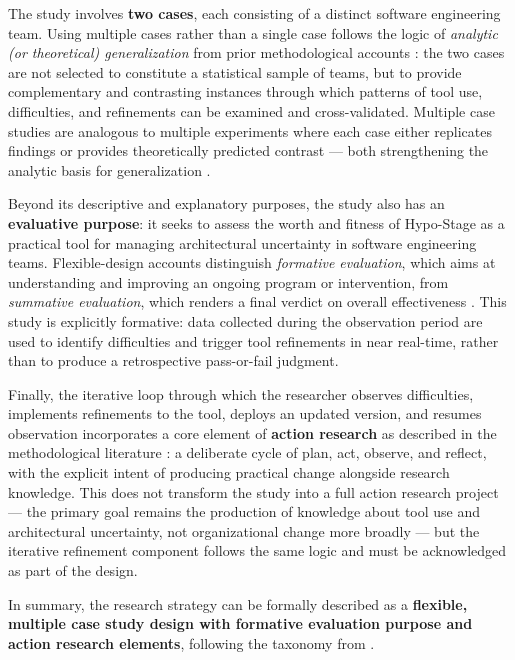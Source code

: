 The study involves \textbf{two cases}, each consisting of a distinct software
engineering team. Using multiple cases rather than a single case follows the logic
of \emph{analytic (or theoretical) generalization} from prior methodological accounts \citep{robson2016,yin2009}: the
two cases are not selected to constitute a statistical sample of teams, but to provide
complementary and contrasting instances through which patterns of tool use,
difficulties, and refinements can be examined and cross-validated. Multiple case studies are analogous to multiple
experiments where each case either replicates findings or provides theoretically predicted contrast --- both strengthening the analytic basis for generalization \citep{robson2016}.

Beyond its descriptive and explanatory purposes, the study also has an
\textbf{evaluative purpose}: it seeks to assess the worth and fitness of Hypo-Stage
as a practical tool for managing architectural uncertainty in software engineering
teams. Flexible-design accounts distinguish \emph{formative evaluation}, which
aims at understanding and improving an ongoing program or intervention, from
\emph{summative evaluation}, which renders a final verdict on overall effectiveness \citep{robson2016}.
This study is explicitly formative: data collected during the observation period are used to identify difficulties and trigger tool refinements in near real-time, rather than to produce a retrospective pass-or-fail judgment.

Finally, the iterative loop through which the researcher observes difficulties,
implements refinements to the tool, deploys an updated version, and resumes
observation incorporates a core element of \textbf{action research} as described
in the methodological literature \citep{robson2016}: a deliberate cycle of plan, act, observe,
and reflect, with the explicit intent of producing practical change alongside
research knowledge. This does not transform the study into a full action research
project --- the primary goal remains the production of knowledge about tool use and
architectural uncertainty, not organizational change more broadly --- but the
iterative refinement component follows the same logic and must be acknowledged as
part of the design.

In summary, the research strategy can be formally described as a
\textbf{flexible, multiple case study design with formative evaluation purpose and
action research elements}, following the taxonomy from \citet{robson2016}.

